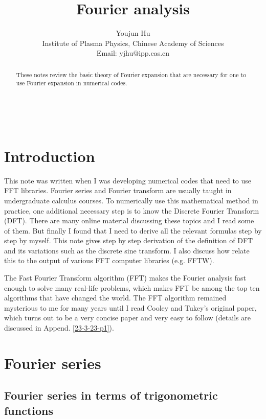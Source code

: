 \documentclass{article}
\newcommand{\tmaffiliation}[1]{\\ #1}
\begin{document}
\

\title{Fourier analysis}

\author{
  Youjun Hu
  \tmaffiliation{Institute of Plasma Physics, Chinese Academy of Sciences\\
  Email: yjhu@ipp.cas.cn}
}

\maketitle

\begin{abstract}
  These notes review the basic theory of Fourier expansion that are necessary
  for one to use Fourier expansion in numerical codes.
\end{abstract}

\section{Introduction}

This note was written when I was developing numerical codes that need to use
FFT libraries. Fourier series and Fourier transform are usually taught in
undergraduate calculus courses. To numerically use this mathematical method in
practice, one additional necessary step is to know the Discrete Fourier
Transform (DFT). There are many online material discussing these topics and I
read some of them. But finally I found that I need to derive all the relevant
formulas step by step by myself. This note gives step by step derivation of
the definition of DFT and its variations such as the discrete sine transform.
I also discuss how relate this to the output of various FFT computer libraries
(e.g. FFTW).

The Fast Fourier Transform algorithm (FFT) makes the Fourier analysis fast
enough to solve many real-life problems, which makes FFT be among the top ten
algorithms that have changed the world. The FFT algorithm remained mysterious
to me for many years until I read Cooley and Tukey's original paper, which
turns out to be a very concise paper and very easy to follow (details are
discussed in Append. \ref{23-3-23-p1}).

\section{Fourier series}

\subsection{Fourier series in terms of trigonometric functions}
\end{document}
